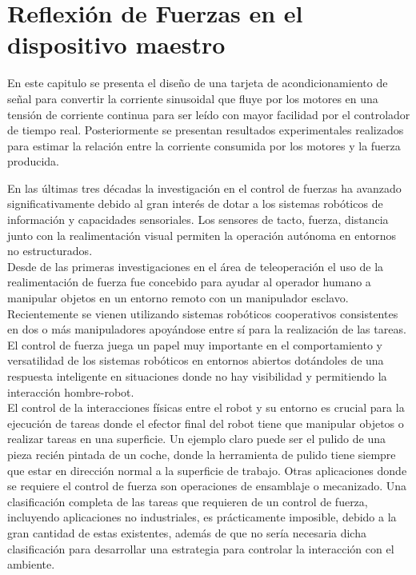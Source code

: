 \chapter{Reflexión de Fuerzas en el dispositivo maestro}
\begin{flushright}
\begin{minipage}{0,7\textwidth}

En este capitulo se presenta el diseño de una tarjeta de acondicionamiento de señal para convertir la corriente sinusoidal que fluye por los motores en una tensión de corriente continua para ser leído con mayor facilidad por el controlador de tiempo real. Posteriormente se presentan resultados experimentales realizados para estimar la relación entre la corriente consumida por los motores y la fuerza producida.

\end{minipage}
\end{flushright}



\newpage
En las últimas tres décadas la investigación en el control de fuerzas ha avanzado significativamente debido al gran interés de dotar a los sistemas robóticos de información y capacidades sensoriales. Los sensores de tacto, fuerza, distancia junto con la realimentación visual permiten la operación autónoma en entornos no estructurados.\\


Desde de las primeras investigaciones en el área de teleoperación el uso de la realimentación de fuerza fue concebido para ayudar al operador humano a manipular objetos en un entorno remoto con un manipulador esclavo. Recientemente se vienen utilizando sistemas robóticos cooperativos consistentes en dos o más manipuladores apoyándose entre s\'i para la realizaci\'on de las tareas.\\

El control de fuerza juega un papel muy importante en el comportamiento y versatilidad de los sistemas robóticos en entornos abiertos dotándoles de una respuesta inteligente en situaciones donde no hay visibilidad y permitiendo la interacción hombre-robot.\\



El control de la interacciones físicas entre el robot y su entorno es crucial para la ejecución de tareas donde el efector final del robot tiene que manipular objetos o realizar tareas en una superficie. Un ejemplo claro puede ser el pulido de una pieza recién pintada de un coche, donde la herramienta de pulido tiene siempre que estar en dirección normal a la superficie de trabajo. Otras aplicaciones donde se requiere el control de fuerza son operaciones de ensamblaje o mecanizado. Una clasificación completa de las tareas que requieren de un control de fuerza, incluyendo aplicaciones no industriales, es prácticamente imposible, debido a la gran cantidad de estas existentes, además de que no sería necesaria dicha clasificación para desarrollar una estrategia para controlar la interacción con el ambiente.\\


